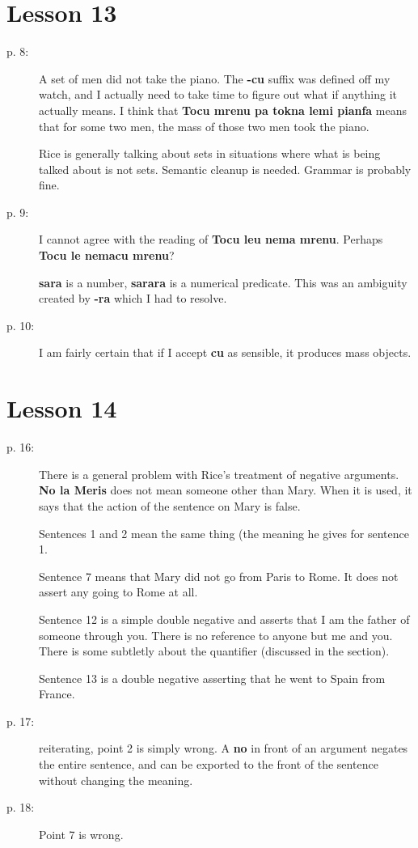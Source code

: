 \documentclass[12pt]{article}
\begin{document}
\section{Lesson 13}

\begin{description}

\item[p. 8:]   A set of men did not take the piano.  The {\bf -cu} suffix was defined off my watch, and I actually need to take time to figure out what if anything it actually means.  I think that {\bf Tocu mrenu pa tokna lemi pianfa} means that for some two men, the mass of those two men took the piano.

Rice is generally talking about sets in situations where what is being talked about is not sets.  Semantic cleanup is needed.  Grammar is probably fine.

\item[p. 9:]  I cannot agree with the reading of {\bf Tocu leu nema mrenu}.  Perhaps {\bf Tocu le nemacu mrenu}?

{\bf sara} is a number, {\bf sarara} is a numerical predicate.  This was an ambiguity created by {\bf -ra} which I had to resolve.

\item[p. 10:]  I am fairly certain that if I accept {\bf cu} as sensible, it produces mass objects.



\end{description}

\section{Lesson 14}

\begin{description}

\item[p. 16:]  There is a general problem with Rice's treatment of negative arguments.  {\bf No la Meris} does not mean someone other than Mary.  When it is used, it says that the action of the sentence on Mary is false.

Sentences 1 and 2 mean the same thing (the meaning he gives for sentence 1.

Sentence 7 means that Mary did not go from Paris to Rome.  It does not assert any going to Rome at all.

Sentence 12 is a simple double negative and asserts that I am the father of someone through you.  There is no reference to anyone but me and you.  There is some subtletly about the quantifier (discussed in the section).

Sentence 13 is a double negative asserting that he went to Spain from France.

\item[p. 17:]  reiterating, point 2 is simply wrong.  A {\bf no} in front of an argument negates the entire sentence, and can be exported to the front of the sentence without changing the meaning.

\item[p. 18:]  Point 7 is wrong.



\end{description}
\end{document}
